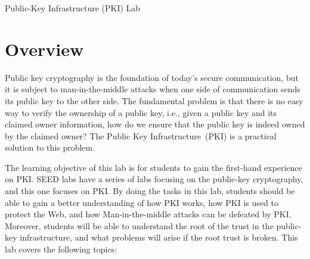 
\newcommand{\commonfolder}{../../common-files}





\newcommand{\pkiFigs}{./Figs}

\newcommand{\OpenSSL} {\texttt{OpenSSL}\xspace}
\newcommand{\pkiserver}{\texttt{bank32.com}\xspace} 





\begin{center}
{\LARGE Public-Key Infrastructure (PKI) Lab}
\end{center}




\section{Overview}



Public key cryptography is the foundation of today's secure
communication, but it is subject
to man-in-the-middle attacks when one side of communication sends its
public key to the other side.  The fundamental problem is
that there is no easy way to verify the ownership of a public key, i.e., given a public key and
its claimed owner information, how do we ensure that the public key is indeed owned by
the claimed owner? The Public Key Infrastructure~(PKI) is a practical solution
to this problem.


The learning objective of this lab is for students to gain the first-hand 
experience on PKI. SEED labs have a series of labs focusing on the public-key cryptography, and 
this one focuses on PKI. By doing the tasks in this lab, students should be able to gain a 
better understanding of how PKI works, how PKI is used to protect the Web, and
how Man-in-the-middle attacks can be defeated by PKI. Moreover, students will be able to
understand the root of the trust in the public-key infrastructure, and what problems 
will arise if the root trust is broken.  This lab covers the following topics:

